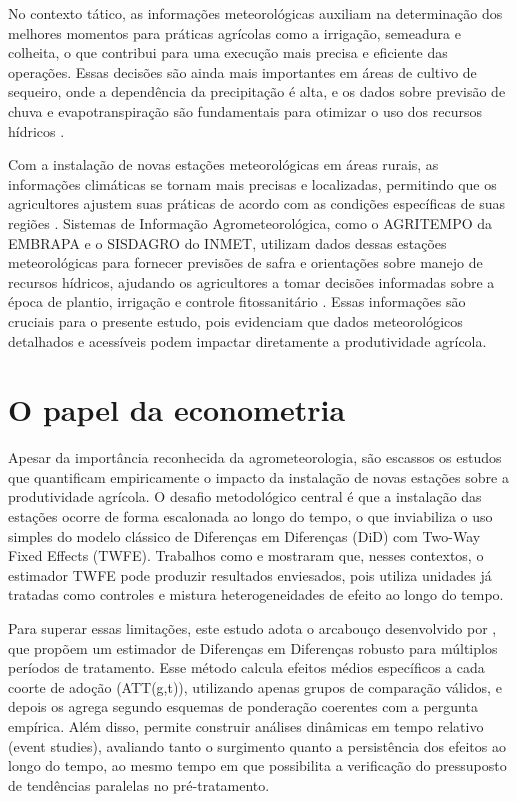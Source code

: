 \documentclass[
	12pt,				%
	openright,			%
	oneside,			%
	a4paper,			%
	english,			%
	french,				%
	spanish,			%
	brazil				%
	]{abntex2}
\begin{document}
No contexto tático, as informações meteorológicas auxiliam na determinação dos melhores momentos para práticas agrícolas como a irrigação, semeadura e colheita, o que contribui para uma execução mais precisa e eficiente das operações. Essas decisões são ainda mais importantes em áreas de cultivo de sequeiro, onde a dependência da precipitação é alta, e os dados sobre previsão de chuva e evapotranspiração são fundamentais para otimizar o uso dos recursos hídricos \cite{pereira2002}.

Com a instalação de novas estações meteorológicas em áreas rurais, as informações climáticas se tornam mais precisas e localizadas, permitindo que os agricultores ajustem suas práticas de acordo com as condições específicas de suas regiões \cite{weiss2000}. Sistemas de Informação Agrometeorológica, como o AGRITEMPO da EMBRAPA e o SISDAGRO do INMET, utilizam dados dessas estações meteorológicas para fornecer previsões de safra e orientações sobre manejo de recursos hídricos, ajudando os agricultores a tomar decisões informadas sobre a época de plantio, irrigação e controle fitossanitário \cite{weiss2000}. Essas informações são cruciais para o presente estudo, pois evidenciam que dados meteorológicos detalhados e acessíveis podem impactar diretamente a produtividade agrícola.

\section{O papel da econometria}

Apesar da importância reconhecida da agrometeorologia, são escassos os estudos que quantificam empiricamente o impacto da instalação de novas estações sobre a produtividade agrícola. O desafio metodológico central é que a instalação das estações ocorre de forma escalonada ao longo do tempo, o que inviabiliza o uso simples do modelo clássico de Diferenças em Diferenças (DiD) com Two-Way Fixed Effects (TWFE). Trabalhos como  e  mostraram que, nesses contextos, o estimador TWFE pode produzir resultados enviesados, pois utiliza unidades já tratadas como controles e mistura heterogeneidades de efeito ao longo do tempo.

Para superar essas limitações, este estudo adota o arcabouço desenvolvido por , que propõem um estimador de Diferenças em Diferenças robusto para múltiplos períodos de tratamento. Esse método calcula efeitos médios específicos a cada coorte de adoção (ATT(g,t)), utilizando apenas grupos de comparação válidos, e depois os agrega segundo esquemas de ponderação coerentes com a pergunta empírica. Além disso, permite construir análises dinâmicas em tempo relativo (event studies), avaliando tanto o surgimento quanto a persistência dos efeitos ao longo do tempo, ao mesmo tempo em que possibilita a verificação do pressuposto de tendências paralelas no pré-tratamento.
\end{document}
